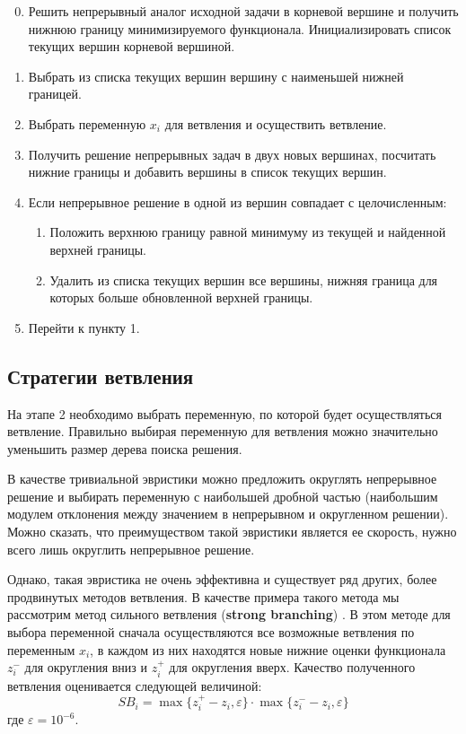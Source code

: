 \documentclass[12pt]{article}
\begin{document}
\begin{enumerate}
    \setcounter{enumi}{-1}
    \item Решить непрерывный аналог исходной задачи в корневой вершине и получить нижнюю границу минимизируемого функционала. Инициализировать список текущих вершин корневой вершиной.
    \item Выбрать из списка текущих вершин вершину с наименьшей нижней границей.
    \item Выбрать переменную $x_i$ для ветвления и осуществить ветвление.
    \item Получить решение непрерывных задач в двух новых вершинах, посчитать нижние границы и добавить вершины в список текущих вершин.
    \item Если непрерывное решение в одной из вершин совпадает с целочисленным:
        \begin{enumerate}
            \item Положить верхнюю границу равной минимуму из текущей и найденной верхней границы.
            \item Удалить из списка текущих вершин все вершины, нижняя граница для которых больше обновленной верхней границы.
        
        \end{enumerate}
    \item Перейти к пункту 1.
\end{enumerate}

\subsection{Стратегии ветвления}

На этапе 2 необходимо выбрать переменную, по которой будет осуществляться ветвление. Правильно выбирая переменную для ветвления можно значительно уменьшить размер дерева поиска решения.

В качестве тривиальной эвристики можно предложить округлять непрерывное решение и выбирать переменную с наибольшей дробной частью (наибольшим модулем отклонения между значением в непрерывном и округленном решении). Можно сказать, что преимуществом такой эвристики является ее скорость, нужно всего лишь округлить непрерывное решение.

Однако, такая эвристика не очень эффективна и существует ряд других, более продвинутых методов ветвления. В качестве примера такого метода мы рассмотрим метод сильного ветвления (\textbf{strong branching}) \cite{10.5555/3015812.3015920}. В этом методе для выбора переменной сначала осуществляются все возможные ветвления по переменным $x_i$, в каждом из них находятся новые нижние оценки функционала $z_i^-$ для округления вниз и $z_i^+$ для округления вверх. Качество полученного ветвления оценивается следующей величиной:
$$
SB_i = \max \big\{ z_i^+ - z_i, \varepsilon \big\} \cdot \max \big\{ z_i^- - z_i, \varepsilon \big\}
$$
где $\varepsilon = 10^{-6}$.
\end{document}
